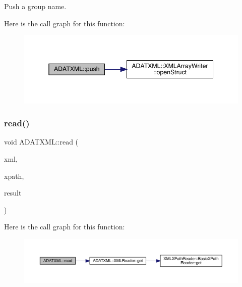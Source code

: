 Push a group name. 

Here is the call graph for this function\+:\nopagebreak
\begin{figure}[H]
\begin{center}
\leavevmode
\includegraphics[width=345pt]{d2/da3/group__io_ga957f4130fa008139cd16879b0794ae54_cgraph}
\end{center}
\end{figure}
\mbox{\label{group__io_ga42921d40fdc242e0dc6200a66c1eb928}} 
\subsubsection{\texorpdfstring{read()}{read()}\hspace{0.1cm}{\footnotesize\ttfamily [1/52]}}
{\footnotesize\ttfamily void A\+D\+A\+T\+X\+M\+L\+::read (\begin{DoxyParamCaption}\item[{\mbox{\hyperlink{classADATXML_1_1XMLReader}{X\+M\+L\+Reader}} \&}]{xml,  }\item[{const std\+::string \&}]{xpath,  }\item[{char \&}]{result }\end{DoxyParamCaption})}

Here is the call graph for this function\+:\nopagebreak
\begin{figure}[H]
\begin{center}
\leavevmode
\includegraphics[width=350pt]{d2/da3/group__io_ga42921d40fdc242e0dc6200a66c1eb928_cgraph}
\end{center}
\end{figure}
\mbox{\label{group__io_ga0e33dbc1e3ebc33bfb45ef5f1b390e45}} 
